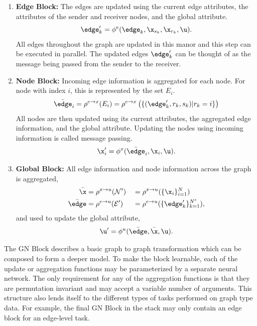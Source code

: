 \begin{enumerate}
    \item \textbf{Edge Block:} The edges are updated using the current edge attributes, the attributes of the sender and receiver nodes, and the global attribute.
    \begin{equation}
        \edge_k' = \phi^e(\edge_k, \x_{s_k}, \x_{r_k}, \u).
    \end{equation}
    All edges throughout the graph are updated in this manor and this step can be executed in parallel.
    The updated edges $\edge_k'$ can be thought of as the message being passed from the sender to the receiver.
    \item \textbf{Node Block:} Incoming edge information is aggregated for each node.
    For node with index $i$, this is represented by the set $E_i$.
    \begin{equation}
        \bar\edge_i = \rho^{e \to x}(E_i) = \rho^{e \to x}\left(\{(\edge_k', r_k, s_k) | r_k = i\}\right)
    \end{equation}
    All nodes are then updated using its current attributes, the aggregated edge information, and the global attribute.
    Updating the nodes using incoming information is called message passing.
    \begin{equation}
        \x_i' = \phi^x(\bar\edge_i, \x_i, \u).
    \end{equation}
    \item \textbf{Global Block:} All edge information and node information across the graph is aggregated,
    \begin{alignat}{2}
        \bar\x &= \rho^{x \to u}(\mathcal{N}') &&= \rho^{x \to u}(\{\x_i\}_{i=1}^{N}) \\
        \bar\edge &= \rho^{e \to u}(\mathcal{E}') &&= \rho^{e \to u}(\{\edge_k'\}_{k=1}^{N^e}),
    \end{alignat}
    and used to update the global attribute,
    \begin{equation}
        \u' = \phi^u( \bar\edge, \bar\x, \u).
    \end{equation}
\end{enumerate}

The GN Block describes a basic graph to graph transformation which can be composed to form a deeper model.
To make the block learnable, each of the update or aggregation functions may be parameterized by a separate neural network.
The only requirement for any of the aggregation functions is that they are permutation invariant and may accept a variable number of arguments.
This structure also lends itself to the different types of tasks performed on graph type data.
For example, the final GN Block in the stack may only contain an edge block for an edge-level task.

